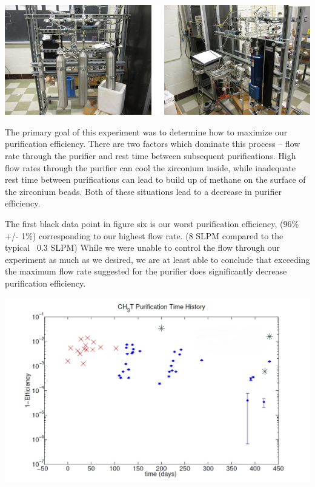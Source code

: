 \documentclass[a4paper,12pt]{article}
\begin{document}
\begin{center}
\includegraphics[scale=0.5]{gassys.jpg}
\end{center}

The primary goal of this experiment was to determine how to maximize our purification efficiency.  There are two factors which dominate this process -- flow rate through the purifier and rest time between subsequent purifications.  High flow rates through the purifier can cool the zirconium inside, while inadequate rest time between purifications can lead to build up of methane on the surface of the zirconium beads.  Both of these situations lead to a decrease in purifier efficiency. 

The first black data point in figure six is our worst purification efficiency, (96\% +/- 1\%) corresponding to our highest flow rate. (8 SLPM compared to the typical ~0.3 SLPM)  While we were unable to control the flow through our experiment as much as we desired, we are at least able to conclude that exceeding the maximum flow rate suggested for the purifier does significantly decrease purification efficiency.

\begin{center}
\includegraphics[scale=0.5]{Figone.jpg}
\end{center}
\end{document}
